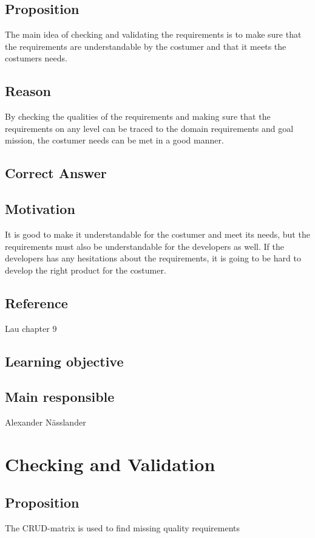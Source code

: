\documentclass[a4paper]{article}
\begin{document}
\subsection*{Proposition}
The main idea of checking and validating the requirements is to make sure that the requirements are understandable by the costumer and that it meets the costumers needs.
\subsection*{Reason}
By checking the qualities of the requirements and making sure that the requirements on any level can be traced to the domain requirements and goal mission, the costumer needs can be met in a good manner.
\subsection*{Correct Answer}

\subsection*{Motivation}
 It is good to make it understandable for the costumer and meet its needs, but the requirements must also be understandable for the developers as well. If the developers has any hesitations about the requirements, it is going to be hard to develop the right product for the costumer.
\subsection*{Reference}
Lau chapter 9
\subsection*{Learning objective}

\subsection*{Main responsible}
Alexander Nässlander

\section{Checking and Validation}

\subsection*{Proposition}
The CRUD-matrix is used to find missing quality requirements
\end{document}
